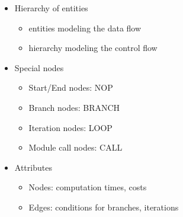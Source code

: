 \begin{itemize}
	\item Hierarchy of entities
\begin{itemize}
	\item entities modeling the data flow
	\item hierarchy modeling the control flow
\end{itemize}
\item Special nodes
\begin{itemize}
	\item Start/End nodes: NOP
	\item Branch nodes: BRANCH
	\item Iteration nodes: LOOP
	\item Module call nodes: CALL
\end{itemize}
\item Attributes
\begin{itemize}
	\item Nodes: computation times, costs
	\item Edges: conditions for branches, iterations
\end{itemize}

\end{itemize}

